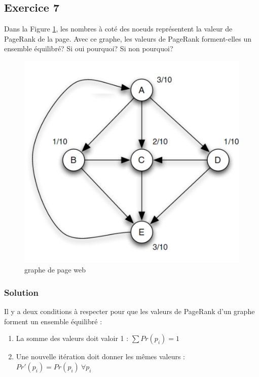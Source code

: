 \subsection*{Exercice 7}
Dans la Figure \ref{fig:equi}, les nombres à coté des noeuds représentent la valeur de PageRank de la page. Avec ce graphe, les valeurs de PageRank forment-elles un ensemble équilibré? Si oui pourquoi? Si non pourquoi?

\begin{figure}[ht!]
	\centering
	\includegraphics[scale=0.3]{figs/equi.png}
	\caption{graphe de page web}
	\label{fig:equi}
\end{figure}

    \subsubsection*{Solution}
    Il y a deux conditions à respecter pour que les valeurs de PageRank d'un graphe forment un ensemble équilibré :
    \begin{enumerate}
        \item La somme des valeurs doit valoir 1 : $\sum Pr(p_i) = 1$
        \item Une nouvelle itération doit donner les mêmes valeurs : $Pr'(p_i) = Pr(p_i) \ \forall p_i$\\
    \end{enumerate}

